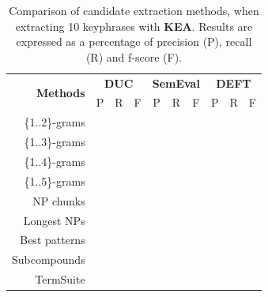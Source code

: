     \begin{table}[h]
      \centering
      \begin{tabular}{rccccccccc}
        \toprule
        \multirow{2}{*}[-2pt]{\textbf{Methods}} & \multicolumn{3}{c}{\textbf{DUC}} & \multicolumn{3}{c}{\textbf{SemEval}} & \multicolumn{3}{c}{\textbf{DEFT}}\\
        \cmidrule(r){2-4}\cmidrule(lr){5-7}\cmidrule(l){8-10}
        & P & R & F & P & R & F & P & R & F\\
        \midrule
        \{1..2\}-grams & & & & & & & & &\\
        \{1..3\}-grams & & & & & & & & &\\
        \{1..4\}-grams & & & & & & & & &\\
        \{1..5\}-grams & & & & & & & & &\\
        NP chunks & & & & & & & & &\\
        Longest NPs & & & & & & & & &\\
        Best patterns & & & & & & & & &\\
        Subcompounds & & & & & & & & &\\
        TermSuite & & & & & & & & &\\
        \bottomrule
      \end{tabular}
      \caption{Comparison of candidate extraction methods, when extracting 10
               keyphrases with \textbf{KEA}. Results are expressed as a
               percentage of precision (P), recall (R) and f-score (F).
               \label{tab:keyphrase_extraction_results}}
    \end{table}

